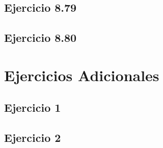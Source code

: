 \documentclass[12pt]{article}
\begin{document}
\subsection{Ejercicio 8.79}
 

\subsection{Ejercicio 8.80}



\section{Ejercicios Adicionales}

\subsection{Ejercicio 1}
 

\subsection{Ejercicio 2}
 
\end{document}
